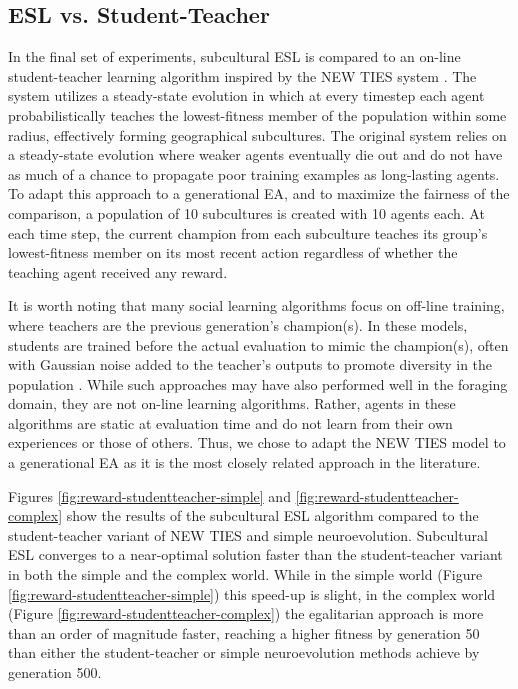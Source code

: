 \documentclass{sig-alternate}
\begin{document}
\subsection*{ESL vs. Student-Teacher}
In the final set of experiments, subcultural ESL is compared to an on-line student-teacher learning algorithm inspired by the NEW TIES system \cite{haasdijk2008social}. The system utilizes a steady-state evolution in which at every timestep each agent probabilistically teaches the lowest-fitness member of the population within some radius, effectively forming geographical subcultures. The original system relies on a steady-state evolution where weaker agents eventually die out and do not have as much of a chance to propagate poor training examples as long-lasting agents. To adapt this approach to a generational EA, and to maximize the fairness of the comparison, a population of 10 subcultures is created with 10 agents each. At each time step, the current champion from each subculture teaches its group's lowest-fitness member on its most recent action regardless of whether the teaching agent received any reward.

It is worth noting that many social learning algorithms focus on off-line training, where teachers are the previous generation's champion(s). In these models, students are trained before the actual evaluation to mimic the champion(s), often with Gaussian noise added to the teacher's outputs to promote diversity in the population \cite{denaro1996cultural}. While such approaches may have also performed well in the foraging domain, they are not on-line learning algorithms. Rather, agents in these algorithms are static at evaluation time and do not learn from their own experiences or those of others. Thus, we chose to adapt the NEW TIES model to a generational EA as it is the most closely related approach in the literature.

Figures \ref{fig:reward-studentteacher-simple} and \ref{fig:reward-studentteacher-complex} show the results of the subcultural ESL algorithm compared to the student-teacher variant of NEW TIES and simple neuroevolution. Subcultural ESL converges to a near-optimal solution faster than the student-teacher variant in both the simple and the complex world. While in the simple world (Figure \ref{fig:reward-studentteacher-simple}) this speed-up is slight, in the complex world (Figure  \ref{fig:reward-studentteacher-complex}) the egalitarian approach is more than an order of magnitude faster, reaching a higher fitness by generation 50 than either the student-teacher or simple neuroevolution methods achieve by generation 500.
\end{document}
